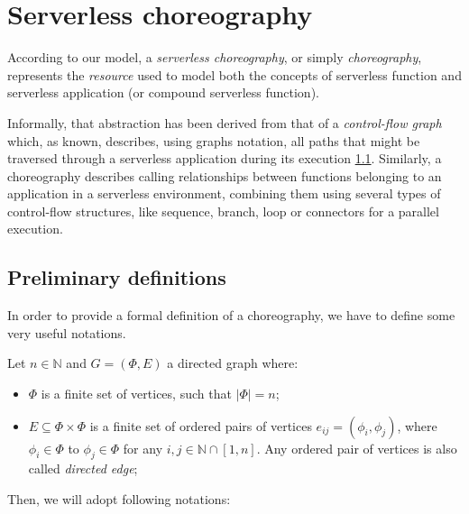 \documentclass[12pt,a4paper]{report}
\newcommand{\N}{\mathbb{N}}
\begin{document}
\section{Serverless choreography}

According to our model, a \textit{serverless choreography}, or simply \textit{choreography}, represents the \textit{resource} used to model both the concepts of serverless function and serverless application (or compound serverless function).

Informally, that abstraction has been derived from that of a \textit{control-flow graph} which, as known, describes, using graphs notation, all paths that might be traversed through a serverless application during its execution \ref{}. Similarly, a choreography describes calling relationships between functions belonging to an application in a serverless environment, combining them using several types of control-flow structures, like sequence, branch, loop or connectors for a parallel execution. 

\subsection{Preliminary definitions}

In order to provide a formal definition of a choreography, we have to define some very useful notations. 

Let $n \in \N$ and $G = (\Phi,E)$ a directed graph where:

\begin{itemize}
	\item $\Phi$ is a finite set of vertices, such that $|\Phi| = n$;
	\item  $E \subseteq \Phi \times \Phi $ is a finite set of ordered pairs of vertices $e_{ij} = \left( \phi_i, \phi_j \right)$, where $\phi_i \in \Phi$ to $\phi_j \in \Phi$ for any $i,j \in \N \cap \left[ 1, n \right]$. Any ordered pair of vertices is also called \textit{directed edge};
\end{itemize}

Then, we will adopt following notations:
\end{document}
